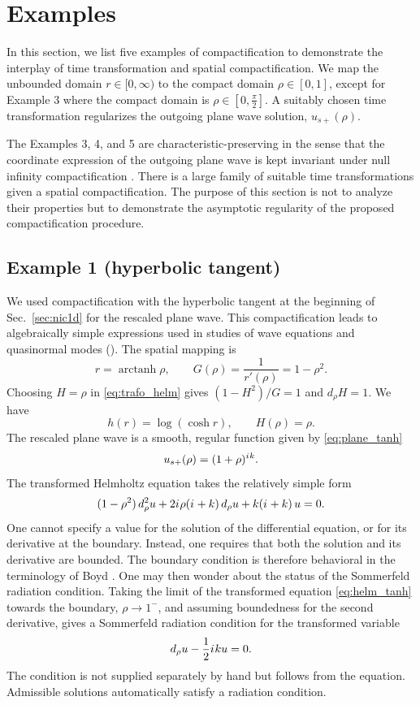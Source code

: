 \documentclass[onefignum,onetabnum]{siamart190516}
\newcommand{\be}{\begin{equation}}
\newcommand{\ee}{\end{equation}}
\newcommand{\iu}{{i\mkern1mu}}
\DeclareMathOperator\arctanh{arctanh}
\begin{document}
\section{Examples}\label{sec:examples}
In this section, we list five examples of compactification to demonstrate the interplay of time transformation and spatial compactification. We map the unbounded domain $r\in[0,\infty)$ to the compact domain $\rho\in[0,1]$, except for Example 3 where the compact domain is $\rho\in[0,\frac{\pi}{2}]$. A suitably chosen time transformation regularizes the outgoing plane wave solution, $u_{s+}(\rho)$. 

The Examples 3, 4, and 5 are characteristic-preserving in the sense that the coordinate expression of the outgoing plane wave is kept invariant under null infinity compactification \cite{ZENGINOGLU20112286, bernuzzi2011binary, zenginouglu2025bridging}. There is a large family of suitable time transformations given a spatial compactification. The purpose of this section is not to analyze their properties but to demonstrate the asymptotic regularity of the proposed compactification procedure.

\subsection{Example 1 (hyperbolic tangent)}\label{sec:tanh}
We used compactification with the hyperbolic tangent at the beginning of Sec.~\ref{sec:nic1d} for the rescaled plane wave. This compactification leads to algebraically simple expressions used in studies of wave equations and quasinormal modes (\cite{bizon2017global, bizon2020toy, donninger2020strichartz}). The spatial mapping is
\be\label{eq:ex1_mapping} r = \arctanh \rho, \qquad G(\rho) = \frac{1}{r'(\rho)} = 1-\rho^2. \ee
Choosing $H=\rho$ in \eqref{eq:trafo_helm} gives $(1-H^2)/G=1$ and $d_\rho H=1$. We have
\[ h(r) = \log(\cosh r), \qquad H(\rho) = \rho. \]
The rescaled plane wave is a smooth, regular function given by \eqref{eq:plane_tanh}
\be\label{eq:tanh_plane} u_{s+}(\rho) = (1+\rho)^{\iu k}.\ee
The transformed Helmholtz equation takes the relatively simple form
\be\label{eq:helm_tanh} (1-\rho^2) \, d_\rho^2 u  + 2\iu \rho (\iu + k) \, d_\rho u + k (\iu+k) \, u = 0. \ee
One cannot specify a value for the solution of the differential equation, or for its derivative at the boundary. Instead, one requires that both the solution and its derivative are bounded. The boundary condition is therefore behavioral in the terminology of Boyd \cite{boyd2001chebyshev}. One may then wonder about the status of the Sommerfeld radiation condition. Taking the limit of the transformed equation \eqref{eq:helm_tanh} towards the boundary, $\rho\to 1^-$, and assuming boundedness for the second derivative, gives a Sommerfeld radiation condition for the transformed variable
\be\label{eq:simple_sommerfeld} d_\rho u - \frac{1}{2} \iu k u = 0. \ee
The condition is not supplied separately by hand but follows from the equation. Admissible solutions automatically satisfy a radiation condition.
\end{document}
